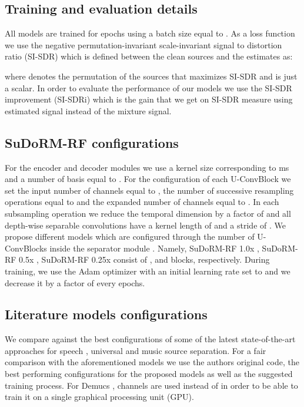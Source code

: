 \documentclass{article}
\theoremstyle{definition}
\newcommand{\sudo}{SuDoRM-RF }
\newcommand{\sudol}{SuDoRM-RF 1.0x }
\newcommand{\sudom}{SuDoRM-RF 0.5x }
\newcommand{\sudos}{SuDoRM-RF 0.25x }
\begin{document}
\subsection{Training and evaluation details}
\label{sec:exp_setup:train_eval}
All models are trained for  epochs using a batch size equal to . As a loss function we use the negative permutation-invariant \cite{Yu2017PIT} scale-invariant signal to distortion ratio (SI-SDR) \cite{le2019sdr} which is defined between the clean sources  and the estimates  as: 

where  denotes the permutation of the sources that maximizes SI-SDR and  is just a scalar. In order to evaluate the performance of our models we use the SI-SDR improvement (SI-SDRi) which is the gain that we get on SI-SDR measure using estimated signal instead of the mixture signal.
\subsection{\sudo configurations}
\label{sec:exp_setup:our_model_config}
For the encoder  and decoder modules  we use a kernel size  corresponding to ms and a number of basis equal to . For the configuration of each U-ConvBlock we set the input number of channels equal to , the number of successive resampling operations equal to  and the expanded number of channels equal to . In each subsampling operation we reduce the temporal dimension by a factor of  and all depth-wise separable convolutions have a kernel length of  and a stride of . We propose  different models which are configured through the number  of U-ConvBlocks inside the separator module . Namely, \sudol, \sudom, \sudos consist of ,  and  blocks, respectively. During training, we use the Adam optimizer \cite{adam} with an initial learning rate set to  and we decrease it by a 
factor of  every  epochs.     
\subsection{Literature models configurations}
\label{sec:exp_setup:literature}
We compare against the best configurations of some of the latest state-of-the-art approaches for speech \cite{luo2019convTasNet, luo2019dual}, universal \cite{tzinis2019two} and music \cite{defossez2019demucs} source separation. For a fair comparison with the aforementioned models we use the authors original code, the best performing configurations for the proposed models as well as the suggested training process. For Demucs \cite{defossez2019demucs},  channels are used instead of  in order to be able to train it on a single graphical processing unit (GPU).
\end{document}
